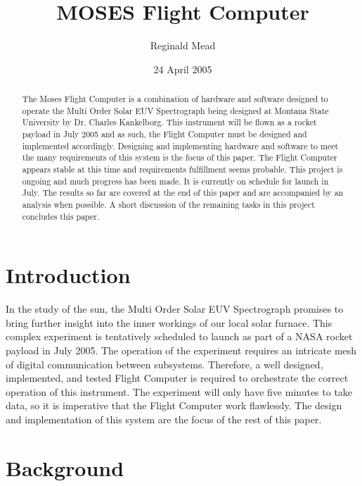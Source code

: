 \documentclass[11pt,titlepage]{article}
\title{MOSES Flight Computer}
\author{Reginald Mead}
\date{24 April 2005}
\begin{document}
\maketitle


\begin{abstract}
The Moses Flight Computer is a combination of hardware and software designed to operate the Multi Order Solar EUV Spectrograph being designed at
Montana State University by Dr. Charles Kankelborg. This instrument will be flown as a rocket payload in July 2005 and as such, the Flight Computer
must be designed and implemented accordingly. Designing and implementing hardware and software to meet the many requirements of this system is the 
focus of this paper. The Flight Computer appears stable at this time and requirements fulfillment seems probable. This project is ongoing and much 
progress has been made. It is currently on schedule for launch in July. The results so far are covered at the end of this paper and are accompanied 
by an analysis when possible. A short discussion of the remaining tasks in this project concludes this paper.

\end{abstract}

\tableofcontents
\newpage



\section{Introduction}

In the study of the sun, the Multi Order Solar EUV Spectrograph promises to bring further insight into the inner workings of our local solar furnace. This
complex experiment is tentatively scheduled to launch as part of a NASA rocket payload in July 2005. The operation of the experiment requires an intricate
mesh of digital communication between subsystems. Therefore, a well designed, implemented, and tested Flight Computer is required to orchestrate the 
correct operation of this instrument. The experiment will only have five minutes to take data, so it is imperative that the Flight Computer work flawlessly.
The design and implementation of this system are the focus of the rest of this paper.


\section{Background}
\end{document}
